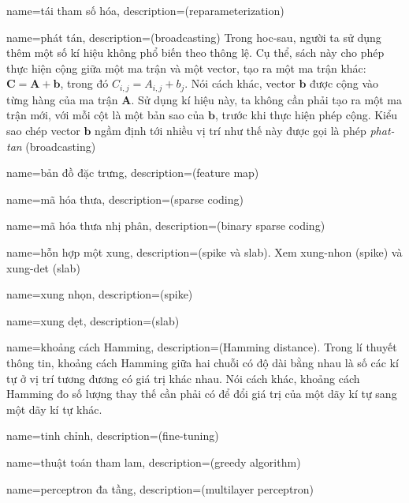{
    name={tái tham số hóa},
    description={(reparameterization)}
}

{
    name={phát tán},
    description={(broadcasting) Trong \gls{hoc-sau}, người ta sử dụng thêm một số kí hiệu không phổ biến
    theo thông lệ. Cụ thể, sách này cho phép thực hiện cộng giữa một ma
    trận và một vector, tạo ra một ma trận khác: $\boldsymbol{C} =
    \boldsymbol{A} + \boldsymbol{b}$, trong đó $C_{i,j} = A_{i,j} + b_j$.
    Nói cách khác, vector $\boldsymbol {b}$ được cộng vào từng hàng của ma
    trận $\boldsymbol{A}$. Sử dụng kí hiệu này, ta không cần phải tạo ra
    một ma trận mới, với mỗi cột là một bản sao của $\boldsymbol b$, trước
    khi thực hiện phép cộng. Kiểu sao chép vector $\boldsymbol b$ ngầm
    định tới nhiều vị trí như thế này được gọi là phép \textit{\gls{phat-tan}}
    (broadcasting)}
}

{
    name={bản đồ đặc trưng},
    description={(feature map)}
}

{
    name={mã hóa thưa},
    description={(sparse coding)}
}

{
    name={mã hóa thưa nhị phân},
    description={(binary sparse coding)}
}

{
    name={hỗn hợp một xung},
    description={(spike và slab). Xem \gls{xung-nhon} (spike) và \gls{xung-det} (slab)}
}

{
    name={xung nhọn},
    description={(spike)}
}

{
    name={xung dẹt},
    description={(slab)}
}

{
    name={khoảng cách Hamming}, description={(Hamming distance). Trong lí thuyết
    thông tin, khoảng cách Hamming giữa hai chuỗi có độ dài bằng nhau là số các
    kí tự ở vị trí tương đương có giá trị khác nhau. Nói cách khác, khoảng cách
    Hamming đo số lượng thay thế cần phải có để đổi giá trị của một dãy kí tự
    sang một dãy kí tự khác.}
}

{
    name={tinh chỉnh},
    description={(fine-tuning)}
}

{
    name={thuật toán tham lam},
    description={(greedy algorithm)}
}

{
    name={perceptron đa tầng},
    description={(multilayer perceptron)}
}


